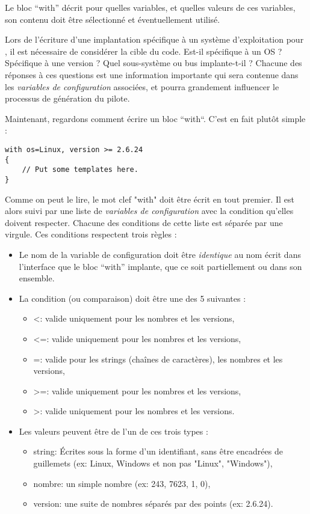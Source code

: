 \documentclass[french]{rtxreport}
\begin{document}
Le bloc “with” décrit pour quelles variables, et quelles valeurs de ces
variables, son contenu doit être sélectionné et éventuellement utilisé.

Lors de l'écriture d'une implantation spécifique à un système d'exploitation
pour \rtx, il est nécessaire de considérer la cible du code. Est-il spécifique
à un OS ? Spécifique à une version ? Quel sous-système ou bus implante-t-il ?
Chacune des réponses à ces questions est une information importante qui sera
contenue dans les \emph{variables de configuration} associées, et pourra
grandement influencer le processus de génération du pilote.

Maintenant, regardons comment écrire un bloc “with“. C'est en fait plutôt
simple :
\begin{lstlisting}
with os=Linux, version >= 2.6.24
{
    // Put some templates here.
}
\end{lstlisting}

Comme on peut le lire, le mot clef "with" doit être écrit en tout premier. Il
est alors suivi par une liste de \emph{variables de configuration} avec la
condition qu'elles doivent respecter. Chacune des conditions de cette liste est
séparée par une virgule. Ces conditions respectent trois règles :
\begin{itemize}
    \item Le nom de la variable de configuration doit être \emph{identique}
          au nom écrit dans l'interface que le bloc “with” implante, que ce
          soit partiellement ou dans son ensemble.
    \item La condition (ou comparaison) doit être une des 5 suivantes : 
        \begin{itemize}
            \item <: valide uniquement pour les nombres et les versions,
            \item <=: valide uniquement pour les nombres et les versions,
            \item =: valide pour les strings (chaînes de caractères),
                     les nombres et les versions,
            \item >=: valide uniquement pour les nombres et les versions,
            \item >: valide uniquement pour les nombres et les versions.
        \end{itemize}
    \item Les valeurs peuvent être de l'un de ces trois types :
        \begin{itemize}
            \item string: Écrites sous la forme d'un identifiant, sans être
                          encadrées de guillemets
                           (ex: Linux, Windows et non pas "Linux", "Windows"),
            \item nombre: un simple nombre (ex: 243, 7623, 1, 0),
            \item version: une suite de nombres séparés par des points
                           (ex: 2.6.24).
        \end{itemize}
\end{itemize}
\end{document}
